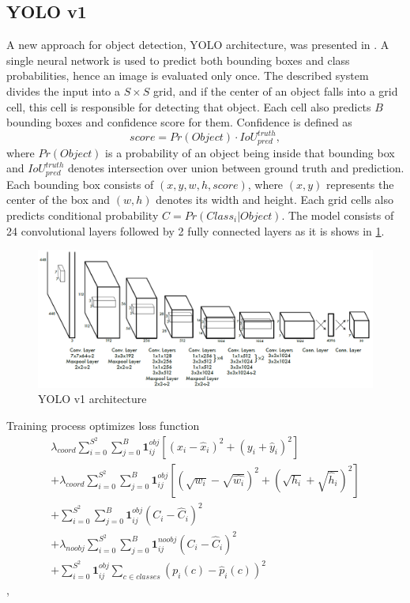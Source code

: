 \documentclass[twoside]{ctuthesis}
\theoremstyle{plain}
\theoremstyle{definition}
\theoremstyle{note}
\begin{document}
\subsection{YOLO v1}
A new approach for object detection, YOLO architecture, was presented in \cite{redmon_divvala_girshick_farhadi_2016}. A single neural network is used to predict both bounding boxes and class probabilities, hence an image is evaluated only once. The described system divides the input into a $S \times S$ grid, and if the center of an object falls into a grid cell, this cell is responsible for detecting that object. Each cell also predicts $B$ bounding boxes and confidence score for them. Confidence is defined as 
\begin{equation}
score = Pr(Object)\cdot IoU^{truth}_{pred},
\end{equation}
where $Pr(Object)$ is a probability of an object being inside that bounding box and $IoU^{truth}_{pred}$ denotes intersection over union between ground truth and prediction. 
Each bounding box consists of $\left(x, y, w, h, score\right)$, where $\left(x, y\right)$ represents the center of the box and $\left(w, h\right)$ denotes its width and height. Each grid cells also predicts conditional probability $C = Pr(Class_i|Object)$.
The model consists of 24 convolutional layers followed by 2 fully connected layers as it is shows in \ref{yolov1}.
\begin{figure}[h]
\caption{YOLO v1 architecture}
\label{yolov1}
\includegraphics[width=\textwidth]{images/used_networks/yolov1.png}
\end{figure}
Training process optimizes loss function
\begin{multline}
\lambda_{coord}\sum_{i=0}^{S^2}\sum_{j=0}^{B}\textbf{1}_{ij}^{obj}\left[\left(x_i - \hat{x}_i\right)^2+\left(y_i + \hat{y}_i\right)^2\right]\\
+\lambda_{coord}\sum_{i=0}^{S^2}\sum_{j=0}^{B}\textbf{1}_{ij}^{obj}\left[\left(\sqrt{w_i} - \sqrt{\hat{w_i}}\right)^2+\left(\sqrt{h_i} + \sqrt{\hat{h}_i}\right)^2\right]\\
+\sum_{i=0}^{S^2}\sum_{j=0}^{B}\textbf{1}_{ij}^{obj}\left(C_i-\hat{C}_i\right)^2\\
+\lambda_{noobj}\sum_{i=0}^{S^2}\sum_{j=0}^{B}\textbf{1}_{ij}^{noobj}\left(C_i-\hat{C}_i\right)^2\\
+\sum_{i=0}^{S^2}\textbf{1}_{ij}^{obj}\sum_{c\in classes}\left(p_i(c) - \hat{p}_i(c)\right)^2
\end{multline},
\end{document}
